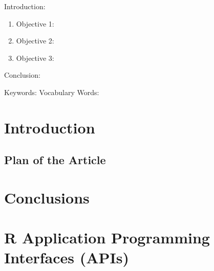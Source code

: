 

\twocolumn
\scriptsize
\begin{frontmatter}
		\title{}
		\author{}
		\address{The Mathematical Learning Space}
\end{frontmatter}	

Introduction:
\begin{enumerate}
\item Objective 1:
\item Objective 2:
\item Objective 3:
\end{enumerate}
Conclusion:

Keywords:
Vocabulary Words:

\section{Introduction}

\subsection{Plan of the Article}


\section{Conclusions}


\section{R Application Programming Interfaces (APIs)}





\begin{thebibliography}{00}

\end{thebibliography}

